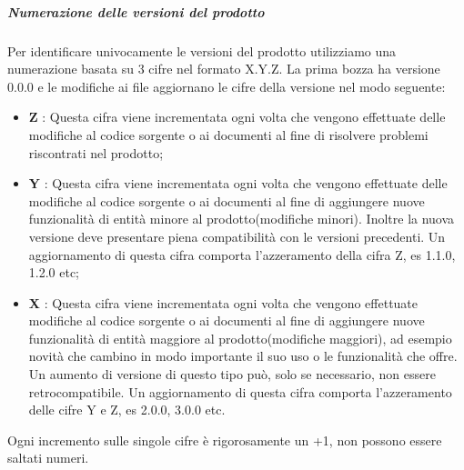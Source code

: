 		\subparagraph*{Numerazione delle versioni del prodotto}
		Per identificare univocamente le versioni del prodotto utilizziamo una numerazione basata su 3 cifre nel formato X.Y.Z. La prima bozza ha versione 0.0.0 e le modifiche ai file aggiornano le cifre della versione nel modo seguente:
		\begin{itemize}
			\item \textbf{Z} : Questa cifra viene incrementata ogni volta che vengono effettuate delle modifiche al codice sorgente o ai documenti al fine di risolvere problemi riscontrati nel prodotto\glo;
			\item \textbf{Y} : Questa cifra viene incrementata ogni volta che vengono effettuate delle modifiche al codice sorgente o ai documenti al fine di aggiungere nuove funzionalità di entità minore al prodotto\glo(modifiche minori\glo). Inoltre la nuova versione deve presentare piena compatibilità con le versioni precedenti. Un aggiornamento di questa cifra comporta l'azzeramento della cifra Z, es 1.1.0, 1.2.0 etc;
			\item \textbf{X} : Questa cifra viene incrementata ogni volta che vengono effettuate modifiche al codice sorgente o ai documenti al fine di aggiungere nuove funzionalità di entità maggiore al prodotto\glo(modifiche maggiori\glo), ad esempio novità che cambino in modo importante il suo uso o le funzionalità che offre. Un aumento di versione di questo tipo può, solo se necessario, non essere retrocompatibile. Un aggiornamento di questa cifra comporta l'azzeramento delle cifre Y e Z, es 2.0.0, 3.0.0 etc.
		\end{itemize}
		Ogni incremento sulle singole cifre è rigorosamente un +1, non possono essere saltati numeri.
		
